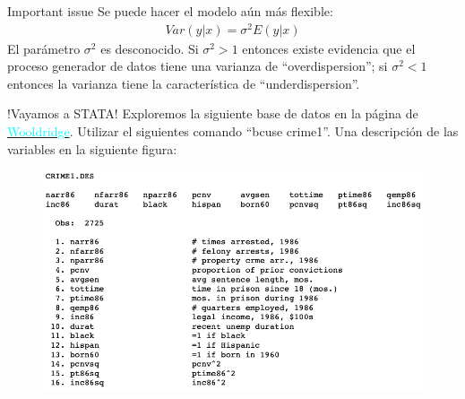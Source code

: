 \begin{frame}{Important issue}
	Se puede hacer el modelo aún más flexible:
		\begin{align}
			Var(y|x)=\sigma^2 E(y|x)
		\end{align}
	El parámetro $\sigma^2$ es desconocido. Si $\sigma^2>1$ entonces existe evidencia que el proceso generador de datos tiene una varianza de ``overdispersion''; si $\sigma^2<1$ entonces la varianza tiene la característica de ``underdispersion''.
\end{frame}
\begin{frame}{!Vayamos a STATA!}
	Exploremos la siguiente base de datos en la página de \href{http://fmwww.bc.edu/ec-p/data/wooldridge/datasets.list.html}{\textcolor{cyan}{Wooldridge}}. Utilizar el siguientes comando ``bcuse crime1''. Una descripción de las variables en la siguiente figura:
		\begin{figure}[htbp]
			\hspace*{+1cm} 
			\centering
				\includegraphics[width=0.63\linewidth]{fig/crime1} %
			\label{crime1}
		\end{figure} 
\end{frame}